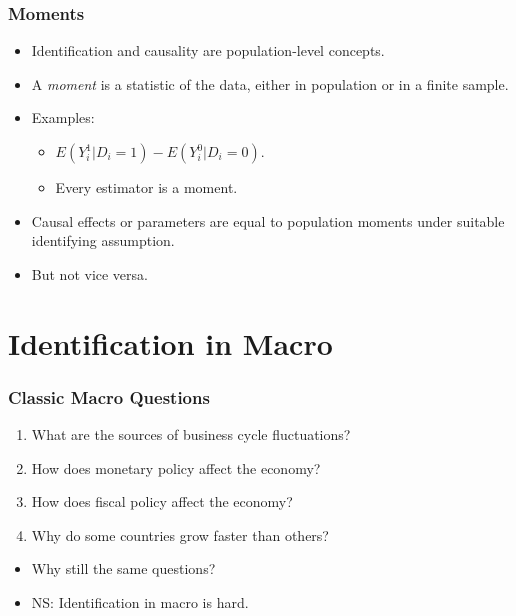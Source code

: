 \documentclass[english,xcolor=svgnames]{beamer}
\begin{document}
\begin{frame}
\frametitle[alignment=center]{Moments}
\begin{itemize}
	\item Identification and causality are population-level concepts.
	\item A \emph{moment} is a statistic of the data, either in population or in a finite sample. 
	\item Examples:
	\begin{itemize}
		\item $E(Y_i^1 | D_i=1 ) - E(Y_i^0 | D_i=0 )$.
		\item Every estimator is a moment.
	\end{itemize}
	\item Causal effects or parameters are equal to population moments under suitable identifying assumption.
	\item But not vice versa.
\end{itemize}
\end{frame}



\section{Identification in Macro}


\begin{frame}
\frametitle[alignment=center]{Classic Macro Questions}
\begin{enumerate}
	\item What are the sources of business cycle fluctuations? 
	\item How does monetary policy affect the economy? 
	\item How does fiscal policy affect the economy? 
	\item Why do some countries grow faster than others? \\
\end{enumerate}
\begin{itemize}
	\item Why still the same questions? 
	\item NS: Identification in macro is hard.
\end{itemize}
\end{frame}
\end{document}

